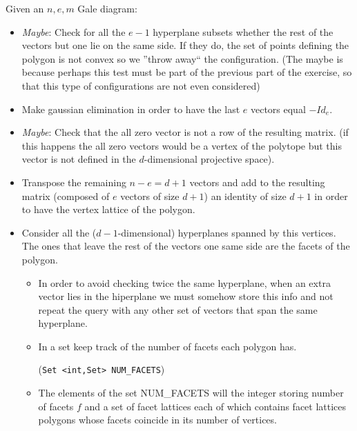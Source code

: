 \documentclass[11pt]{amsart}
\begin{document}
\begin{enumerate}
Given an $n,e,m$ Gale diagram:
\begin{itemize}
 \item {\em Maybe}: Check for all the $e-1$ hyperplane subsets whether the rest of the vectors but one lie on the same side. If they do, the set of points defining the polygon is not convex so we ''throw away`` the configuration. (The maybe is because perhaps this test must be part of the previous part of the exercise, so that this type of configurations are not even considered) %
 \item Make gaussian elimination in order to have the last $e$ vectors equal $-Id_{e}$.
 \item {\em Maybe}: Check that the all zero vector is not a row of the resulting matrix. (if this happens the all zero vectors would be a vertex of the polytope but this vector is not defined in the $d$-dimensional projective space).%
 \item Transpose the remaining $n-e=d+1$ vectors and add to the resulting matrix (composed of $e$ vectors of size $d+1$) an identity of size $d+1$ in order to have the vertex lattice of the polygon.
 \item Consider all the ($d-1$-dimensional) hyperplanes spanned by this vertices. The ones that leave the rest of the vectors one same side are the facets of the polygon.
 \begin{itemize}
  \item In order to avoid checking twice the same hyperplane, when an extra vector lies in the hiperplane we must somehow store this info and not repeat the query with any other set of vectors that span the same hyperplane.
  \item In a set keep track of the number of facets each polygon has.
  
  (\verb+Set <int,Set> NUM_FACETS+)
  \item The elements of the set NUM\_FACETS will the integer storing number of facets $f$ and a set of facet lattices each of which contains facet lattices polygons whose facets coincide in its number of vertices. 
  

\end{itemize}
\end{itemize}
\end{enumerate}
\end{document}
